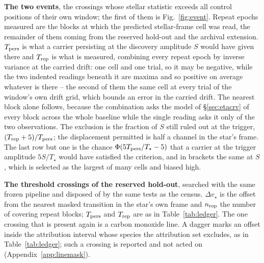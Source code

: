 \begin{table}
\centering
\caption{\textbf{The two events}, the crossings whose
stellar statistic exceeds all \NCtrl{} control positions of their own window;
the first of them is Fig.~\ref{fig:event}.
Repeat epochs measured are the blocks at which the predicted stellar-frame
cell was read, the remainder of them coming from the reserved hold-out and the
archival extension.
$T_{\rm pers}$ is what a carrier persisting at the discovery amplitude $S$
would have given there and $T_{\rm rep}$ is what is measured, combining every
repeat epoch by inverse variance at the carried drift: one cell and one
trial, so it may be negative, while the two indented readings beneath it are
maxima and so positive on average whatever is there -- the second of them
the same cell at every trial of the window's own drift grid, which bounds an
error in the carried drift. The nearest block alone
follows, because the combination asks the model of \S\ref{sec:etacrv} of
every block across the whole baseline while the single reading asks it only
of the two observations. The exclusion is the fraction of $S$ still
ruled out at the trigger, $(T_{\rm rep}+5)/T_{\rm pers}$; the displacement
permitted is half a channel in the star's frame. The last row but one is the
chance $\Phi(5T_{\rm pers}/T_\star-5)$ that a carrier at the trigger
amplitude $5S/T_\star$ would have satisfied the criterion, and in brackets the
same at $S$, which is selected as the largest of many cells and biased high.}
\label{tab:cand}
\footnotesize

\end{table}

\begin{table}
\centering
\caption{\textbf{The threshold crossings of the reserved hold-out}, searched
with the same frozen pipeline and disposed of by the same tests as the
census. $\Delta v_\star$ is the offset from the nearest masked transition in
the star's own frame and $n_{\rm rep}$ the number of covering repeat blocks;
$T_{\rm pers}$ and $T_{\rm rep}$ are as in Table~\ref{tab:ledger}. The one
crossing that is present again is a carbon monoxide line. A dagger marks an
offset inside the attribution interval whose species the attribution set
excludes, as in Table~\ref{tab:ledger}; such a crossing is reported and not
acted on (Appendix~\ref{app:linemask}).}
\label{tab:holdout}
\scriptsize

\end{table}





